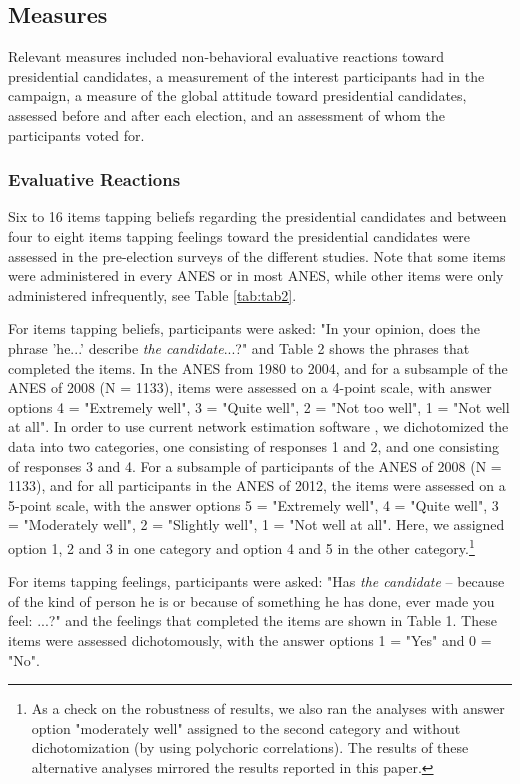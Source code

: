 \documentclass[10pt]{article}
\begin{document}
\begin{multicols}{2}


\subsection*{Measures}
Relevant measures included non-behavioral evaluative reactions toward presidential candidates, a measurement of the interest participants had in the campaign, a measure of the global attitude toward presidential candidates, assessed before and after each election, and an assessment of whom the participants voted for.
\subsubsection*{Evaluative Reactions}
Six to 16 items tapping beliefs regarding the presidential candidates and between four to eight items tapping feelings toward the presidential candidates were assessed in the pre-election surveys of the different studies. Note that some items were administered in every ANES or in most ANES, while other items were only administered infrequently, see Table \ref{tab:tab2}.\par
For items tapping beliefs, participants were asked: "In your opinion, does the phrase 'he...' describe \textit{the candidate}...?" and Table 2 shows the phrases that completed the items. In the ANES from 1980 to 2004, and for a subsample of the ANES of 2008 (N = 1133), items were assessed on a 4-point scale, with answer options 4 = "Extremely well", 3 = "Quite well", 2 = "Not too well", 1 = "Not well at all". In order to use current network estimation software \cite{vanBorkulo2014}, we dichotomized the data into two categories, one consisting of responses 1 and 2, and one consisting of responses 3 and 4. For a subsample of participants of the ANES of 2008 (N = 1133), and for all participants in the ANES of 2012, the items were assessed on a 5-point scale, with the answer options 5 = "Extremely well", 4 = "Quite well", 3 = "Moderately well", 2 = "Slightly well", 1 = "Not well at all". Here, we assigned option 1, 2 and 3 in one category and option 4 and 5 in the other category.\footnote{As a check on the robustness of results, we also ran the analyses with answer option "moderately well" assigned to the second category and without dichotomization (by using polychoric correlations).  The results of these alternative analyses mirrored the results reported in this paper.}\par
For items tapping feelings, participants were asked: "Has \textit{the candidate} -- because of the kind of person he is or because of something he has done, ever made you feel: ...?" and the feelings that completed the items are shown in Table 1. These items were assessed dichotomously, with the answer options 1 = "Yes" and 0 = "No".

\end{multicols}
\end{document}
